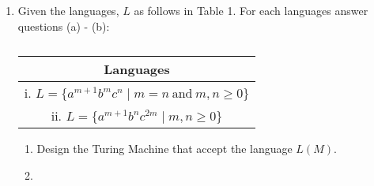 \documentclass[a4paper, 12pt]{article}
\makeatletter
\renewenvironment{proof}[1][\proofname]{\par
  \normalfont \topsep6\p@\@plus6\p@\relax
  \trivlist
  \item[\hskip\labelsep
        \itshape
    #1\@addpunct{.}]\ignorespaces
}{%
  \endtrivlist\@endpefalse
}
\renewcommand{\proofname}{Solution:}
\makeatother
\begin{document}
    \newpage

    \begin{enumerate}
        \item 
        Given the languages, $L$ as follows in Table 1. For each languages answer questions (a) - (b):
        \setcounter{table}{0}
        \begin{table}[ht]
            \centering
            \caption{}
            \begin{tabular}{|c|}
                \hline
                \textbf{Languages} \\ \hline
                i. $L = \{a^{m+1}b^mc^n \mid m=n \ \text{and} \ m, n \geq0\}$ \\ \hline
                ii. $L=\{a^{m+1}b^nc^{2m} \mid m, n \geq 0\}$ \\ \hline
            \end{tabular}
        \end{table}
        \begin{enumerate}
            \item Design the Turing Machine that accept the language $L(M)$.
                \begin{proof}
                \leavevmode
                    \begin{figure}[H]
                        \centering
\end{figure}
\end{proof}
\end{enumerate}
\end{enumerate}
\end{document}
